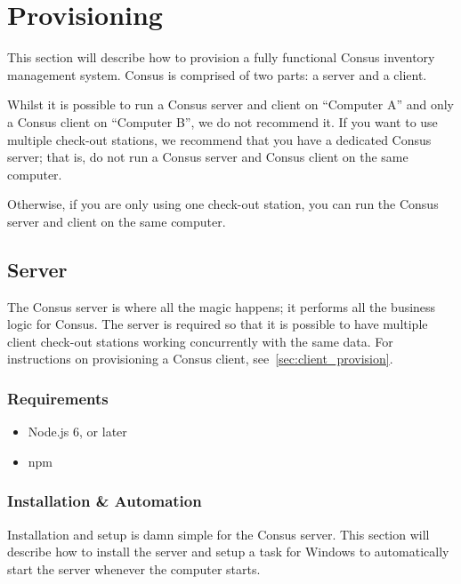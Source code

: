 \chapter{Provisioning}
\label{ch:provisioning}

This section will describe how to provision a fully functional Consus inventory management system.
Consus is comprised of two parts: a server and a client.

Whilst it is possible to run a Consus server and client on ``Computer A'' and only a Consus client on ``Computer B'', we do not recommend it. %
If you want to use multiple check-out stations, we recommend that you have a dedicated Consus server; that is, do not run a Consus server and Consus client on the same computer.

Otherwise, if you are only using one check-out station, you can run the Consus server and client on the same computer.

\section{Server}
\label{sec:server_provision}

The Consus server is where all the magic happens; it performs all the business logic for Consus.
The server is required so that it is possible to have multiple client check-out stations working concurrently with the same data.
For instructions on provisioning a Consus client, see~\autoref{sec:client_provision}.

\subsection{Requirements}
\label{subsec:server_reqs}

\begin{itemize}
  \item Node.js 6, or later
  \item npm
\end{itemize}

\subsection{Installation \& Automation}
\label{subsec:server_install}

Installation and setup is damn simple for the Consus server.
This section will describe how to install the server and setup a task for Windows to automatically start the server whenever the computer starts.

